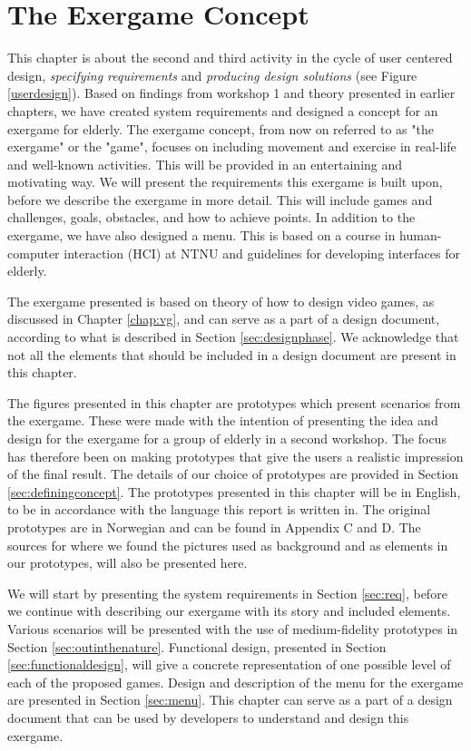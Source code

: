 \chapter{The Exergame Concept}
\label{chap:concept}
This chapter is about the second and third activity in the cycle of user centered design, \emph{specifying requirements} and \emph{producing design solutions} (see Figure \ref{userdesign}). Based on findings from workshop 1 and theory presented in earlier chapters, we have created system requirements and designed a concept for an exergame for elderly. The exergame concept, from now on referred to as "the exergame" or the "game", focuses on including movement and exercise in real-life and well-known activities. This will be provided in an entertaining and motivating way. We will present the requirements this exergame is built upon, before we describe the exergame in more detail. This will include games and challenges, goals, obstacles, and how to achieve points. In addition to the exergame, we have also designed a menu. This is based on a course in human-computer interaction (HCI) at NTNU and guidelines for developing interfaces for elderly. 

The exergame presented is based on theory of how to design video games, as discussed in Chapter \ref{chap:vg}, and can serve as a part of a design document, according to what is described in Section \ref{sec:designphase}. We acknowledge that not all the elements that should be included in a design document are present in this chapter.

The figures presented in this chapter are prototypes which present scenarios from the exergame. These were made with the intention of presenting the idea and design for the exergame for a group of elderly in a second workshop. The focus has therefore been on making prototypes that give the users a realistic impression of the final result. The details of our choice of prototypes are provided in Section \ref{sec:definingconcept}. The prototypes presented in this chapter will be in English, to be in accordance with the language this report is written in. The original prototypes are in Norwegian and can be found in Appendix C and D. The sources for where we found the pictures used as background and as elements in our prototypes, will also be presented here. 

We will start by presenting the system requirements in Section \ref{sec:req}, before we continue with describing our exergame with its story and included elements. Various scenarios will be presented with the use of medium-fidelity prototypes in Section \ref{sec:outinthenature}. Functional design, presented in Section \ref{sec:functionaldesign}, will give a concrete representation of one possible level of each of the proposed games. Design and description of the menu for the exergame are presented in Section \ref{sec:menu}. This chapter can serve as a part of a design document that can be used by developers to understand and design this exergame.  

